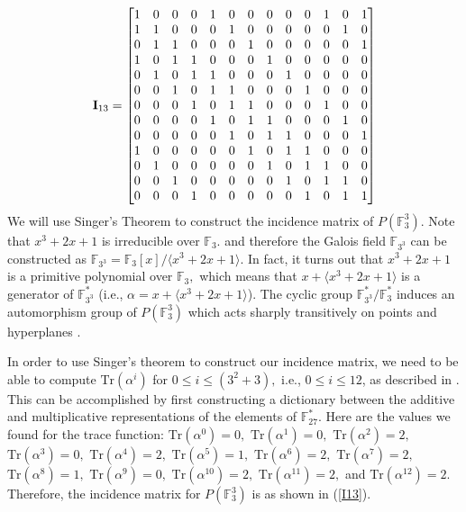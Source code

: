\documentclass[journal,comsoc]{IEEEtran}
\begin{document}
\iffalse 
As the next example illustrates, in addition to revealing an interesting structural feature of incidence matrices, Singer's theorem also gives us an easy way to construct these matrices. \fi
\begin{equation}
\setcounter{MaxMatrixCols}{20}
\mathbf{I}_{13}= \begin{bmatrix} 1 & 0 & 0 & 0 & 1 & 0 & 0 & 0 & 0 & 0 & 1 & 0 & 1 \\
1 & 1 & 0 & 0 & 0 & 1 & 0 & 0 & 0 & 0 & 0 & 1 & 0 \\
0 & 1 & 1 & 0 & 0 & 0 & 1 & 0 & 0 & 0 & 0 & 0 & 1 \\
1 & 0 & 1 & 1 & 0 & 0 & 0 & 1 & 0 & 0 & 0 & 0 & 0 \\
0 & 1 & 0 & 1 & 1 & 0 & 0 & 0 & 1 & 0 & 0 & 0 & 0 \\
0 & 0 & 1 & 0 & 1 & 1 & 0 & 0 & 0 & 1 & 0 & 0 & 0 \\
0 & 0 & 0 & 1 & 0 & 1 & 1 & 0 & 0 & 0 & 1 & 0 & 0 \\
0 & 0 & 0 & 0 & 1 & 0 & 1 & 1 & 0 & 0 & 0 & 1 & 0 \\
0 & 0 & 0 & 0 & 0 & 1 & 0 & 1 & 1 & 0 & 0 & 0 & 1 \\
1 & 0 & 0 & 0 & 0 & 0 & 1 & 0 & 1 & 1 & 0 & 0 & 0 \\
0 & 1 & 0 & 0 & 0 & 0 & 0 & 1 & 0 & 1 & 1 & 0 & 0 \\
0 & 0 & 1 & 0 & 0 & 0 & 0 & 0 & 1 & 0 & 1 & 1 & 0\\
0 & 0 & 0 & 1 & 0 & 0 & 0 & 0 & 0 & 1 & 0 & 1 & 1
\end{bmatrix} \label{I13}
\end{equation}
We will use Singer's Theorem to construct the incidence matrix of $P(\mathbb{F}_3^3)$. Note that $x^3+2x+1$ is irreducible over $\mathbb{F}_3.$ and therefore the Galois field $\mathbb{F}_{3^3}$ can be constructed as $\mathbb{F}_{3^3} = \mathbb{F}_3[x]/\langle x^3+2x+1 \rangle$. In fact, it turns out that $x^3+2x+1$ is a primitive polynomial over $\mathbb{F}_3,$ which means that $x+\langle x^3+2x+1\rangle$ is a generator of $\mathbb{F}_{3^3}^*$ (i.e., $\alpha = x + \langle x^3+2x+1 \rangle$). The cyclic group $\mathbb{F}_{3^3}^*/\mathbb{F}_{3}^*$ induces an automorphism group of $P(\mathbb{F}_3^3)$ which acts sharply transitively on points and hyperplanes \cite{Arasu1995}.

In order to use Singer's theorem to construct our incidence matrix, we need to be able to compute $\text{Tr}(\alpha^i)$ for $0 \leq i \leq (3^2+3),$ i.e., $0 \leq i \leq 12$, as described in \cite{Arasu1995}. This can be accomplished by first constructing a dictionary between the additive and multiplicative representations of the elements of $\mathbb{F}_{27}^*.$ \iffalse  We shall repress the tedious and standard computations needed to construct this dictionary and simply state the \fi Here are the values we found for the trace function: $\text{Tr}(\alpha^0) = 0,$ $\text{Tr}(\alpha^1) = 0,$ $\text{Tr}(\alpha^2) = 2,$ $\text{Tr}(\alpha^3) = 0,$ $\text{Tr}(\alpha^4) = 2,$ $\text{Tr}(\alpha^5) = 1,$ $\text{Tr}(\alpha^6) = 2,$ $\text{Tr}(\alpha^7) = 2,$ $\text{Tr}(\alpha^8) = 1,$ $\text{Tr}(\alpha^9) = 0,$ $\text{Tr}(\alpha^{10}) = 2,$ $\text{Tr}(\alpha^{11}) = 2,$ and $\text{Tr}(\alpha^{12}) = 2$. Therefore, the incidence matrix for $P(\mathbb{F}_3^3)$ is as shown in (\ref{I13}).
\end{document}
